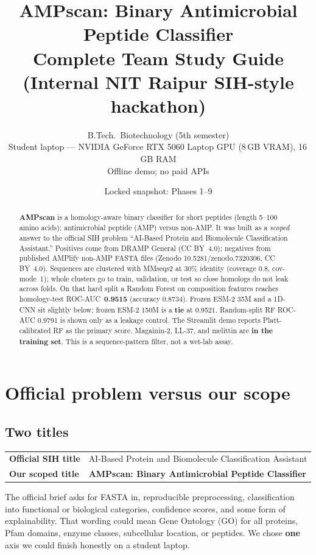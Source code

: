 \documentclass[11pt,a4paper]{report}
\title{\textbf{AMPscan: Binary Antimicrobial Peptide Classifier}\\[0.6em]
\large Complete Team Study Guide\\
(Internal NIT Raipur SIH-style hackathon)}
\author{B.Tech.\ Biotechnology (5th semester)\\
Student laptop --- NVIDIA GeForce RTX 5060 Laptop GPU (8\,GB VRAM), 16\,GB RAM\\
Offline demo; no paid APIs}
\date{Locked snapshot: Phases 1--9}
\begin{document}
\maketitle
\begin{abstract}
\textbf{AMPscan} is a homology-aware binary classifier for short peptides (length 5--100 amino acids): antimicrobial peptide (AMP) versus non-AMP. It was built as a \emph{scoped} answer to the official SIH problem ``AI-Based Protein and Biomolecule Classification Assistant.'' Positives come from DRAMP General (CC BY~4.0); negatives from published AMPlify non-AMP FASTA files (Zenodo 10.5281/zenodo.7320306, CC BY~4.0). Sequences are clustered with MMseqs2 at 30\% identity (coverage 0.8, cov-mode~1); whole clusters go to train, validation, or test so close homologs do not leak across folds. On that hard split a Random Forest on composition features reaches homology-test ROC-AUC~\textbf{0.9515} (accuracy 0.8734). Frozen ESM-2 35M and a 1D-CNN sit slightly below; frozen ESM-2 150M is a \textbf{tie} at 0.9521. Random-split RF ROC-AUC 0.9791 is shown only as a leakage control. The Streamlit demo reports Platt-calibrated RF as the primary score. Magainin-2, LL-37, and melittin are \textbf{in the training set}. This is a sequence-pattern filter, not a wet-lab assay.
\end{abstract}
\tableofcontents
\clearpage

\chapter{Official problem versus our scope}
\label{ch:scope}

\section{Two titles}

\begin{tabularx}{\textwidth}{>{\bfseries}l X}
Official SIH title & AI-Based Protein and Biomolecule Classification Assistant \\
Our scoped title & \textbf{AMPscan: Binary Antimicrobial Peptide Classifier} \\
\end{tabularx}

The official brief asks for FASTA in, reproducible preprocessing, classification into functional or biological categories, confidence scores, and some form of explainability. That wording could mean Gene Ontology (GO) for all proteins, Pfam domains, enzyme classes, subcellular location, or peptides. We chose \textbf{one} axis we could finish honestly on a student laptop.
\end{document}
